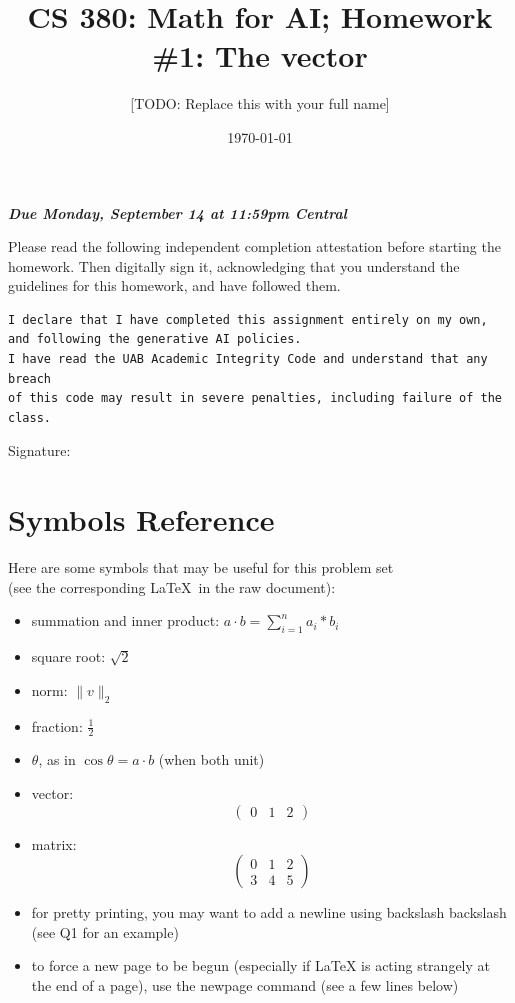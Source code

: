 \documentclass[10pt]{article}
\title{CS 380: Math for AI; Homework \#1: The vector}
\author{[TODO: Replace this with your full name]}
\date{\today}
\renewcommand{\(}{\left(}
\renewcommand{\)}{\right)}
\renewcommand{\emph}[1]{\textit{\textbf{#1}}}
\theoremstyle{plain}
\theoremstyle{plain}
\theoremstyle{definition}
\begin{document}
\maketitle

\begin{center}
  \emph{Due Monday, September 14 at 11:59pm Central}
\end{center}


Please read the following independent completion attestation before starting the
homework.
Then digitally sign it,
acknowledging that you understand the guidelines for this homework,
and have followed them.

\begin{verbatim}
I declare that I have completed this assignment entirely on my own,
and following the generative AI policies.
I have read the UAB Academic Integrity Code and understand that any breach 
of this code may result in severe penalties, including failure of the class.
\end{verbatim}

Signature: 

\section*{Symbols Reference}
Here are some symbols that may be useful for this problem set\\
(see the corresponding \LaTeX\ in the raw document):

\begin{itemize}
\item summation and inner product: $a \cdot b = \sum_{i=1}^n a_i * b_i$
\item square root: $\sqrt{2}$
\item norm: $\|v\|_2$
\item fraction: $\frac{1}{2}$
\item $\theta$, as in $\cos \theta = a \cdot b$ (when both unit)
\item vector:
\[
\begin{pmatrix}
0 & 1 & 2
\end{pmatrix}
\]

\item matrix:
\[
\begin{pmatrix}
0 & 1 & 2\\
3 & 4 & 5
\end{pmatrix}
\]
\item for pretty printing, you may want to add a newline using backslash backslash (see Q1 for an example)
\item to force a new page to be begun (especially if LaTeX is acting strangely at the end of a page), use the newpage command (see a few lines below)
\end{itemize}
\end{document}
